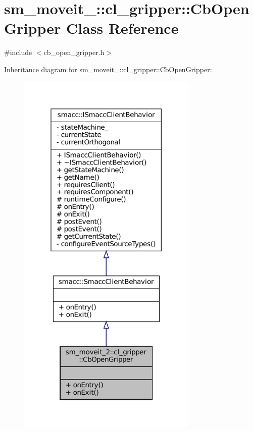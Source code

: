 \hypertarget{classsm__moveit__2_1_1cl__gripper_1_1CbOpenGripper}{}\section{sm\+\_\+moveit\+\_\+:\+:cl\+\_\+gripper\+:\+:Cb\+Open\+Gripper Class Reference}
\label{classsm__moveit__2_1_1cl__gripper_1_1CbOpenGripper}


{\ttfamily \#include $<$cb\+\_\+open\+\_\+gripper.\+h$>$}



Inheritance diagram for sm\+\_\+moveit\+\_\+:\+:cl\+\_\+gripper\+:\+:Cb\+Open\+Gripper\+:
\nopagebreak
\begin{figure}[H]
\begin{center}
\leavevmode
\includegraphics[width=244pt]{classsm__moveit__2_1_1cl__gripper_1_1CbOpenGripper__inherit__graph}
\end{center}
\end{figure}


